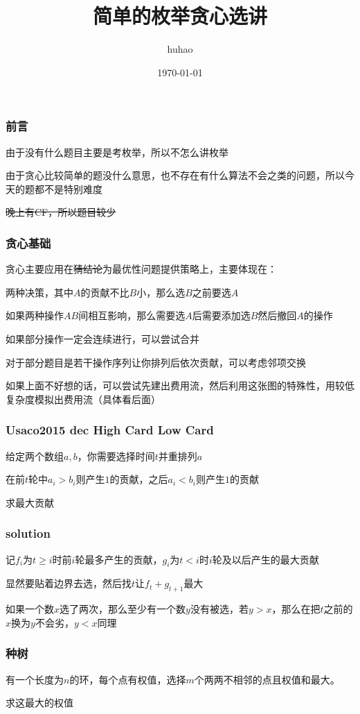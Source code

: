 \documentclass[10pt]{beamer}
\begin{document}
	\title{简单的枚举贪心选讲}
	\date{\today}
	\author{huhao}
	\maketitle
	\clearpage
	\begin{frame}
		\frametitle{前言}
		 由于没有什么题目主要是考枚举，所以不怎么讲枚举

		 由于贪心比较简单的题没什么意思，也不存在有什么算法不会之类的问题，所以今天的题都不是特别难度

		 \sout{晚上有CF，所以题目较少}
	\end{frame}
	\clearpage
	\begin{frame}
		\frametitle{贪心基础}

		 贪心主要应用在\sout{猜结论}为最优性问题提供策略上，主要体现在：

		 两种决策，其中$A$的贡献不比$B$小，那么选$B$之前要选$A$

		 如果两种操作$AB$间相互影响，那么需要选$A$后需要添加选$B$然后撤回$A$的操作

		 如果部分操作一定会连续进行，可以尝试合并

		 对于部分题目是若干操作序列让你排列后依次贡献，可以考虑邻项交换

		 如果上面不好想的话，可以尝试先建出费用流，然后利用这张图的特殊性，用较低复杂度模拟出费用流（具体看后面）
	\end{frame}
	\clearpage
	\begin{frame}
		\frametitle{Usaco2015 dec High Card Low Card}
		\par 给定两个数组$a,b$，你需要选择时间$t$并重排列$a$
		\par 在前$t$轮中$a_i>b_i$则产生$1$的贡献，之后$a_i<b_i$则产生$1$的贡献
		\par 求最大贡献
	\end{frame}
	\clearpage
	\begin{frame}
		\frametitle{solution}

		 记$f_i$为$t\ge i$时前$i$轮最多产生的贡献，$g_i$为$t<i$时$i$轮及以后产生的最大贡献

		 显然要贴着边界去选，然后找$t$让$f_t+g_{t+1}$最大

		 如果一个数$x$选了两次，那么至少有一个数$y$没有被选，若$y>x$，那么在把$t$之前的$x$换为$y$不会劣，$y<x$同理
	\end{frame}
	\clearpage
	\begin{frame}
		\frametitle{种树}
		\par 有一个长度为$n$的环，每个点有权值，选择$m$个两两不相邻的点且权值和最大。
		\par 求这最大的权值
	\end{frame}
\end{document}
